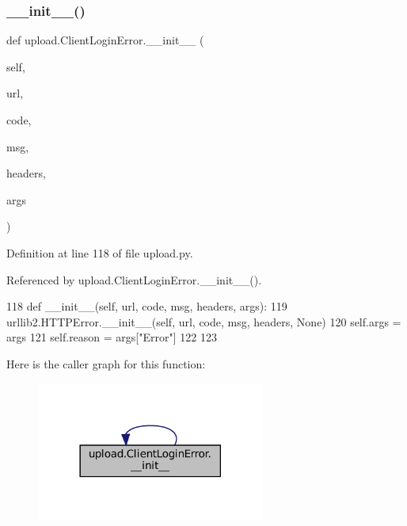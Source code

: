 \subsubsection{\texorpdfstring{\+\_\+\+\_\+init\+\_\+\+\_\+()}{\_\_init\_\_()}\hspace{0.1cm}{\footnotesize\ttfamily [1/2]}}
{\footnotesize\ttfamily def upload.\+Client\+Login\+Error.\+\_\+\+\_\+init\+\_\+\+\_\+ (\begin{DoxyParamCaption}\item[{}]{self,  }\item[{}]{url,  }\item[{}]{code,  }\item[{}]{msg,  }\item[{}]{headers,  }\item[{}]{args }\end{DoxyParamCaption})}



Definition at line 118 of file upload.\+py.



Referenced by upload.\+Client\+Login\+Error.\+\_\+\+\_\+init\+\_\+\+\_\+().


\begin{DoxyCode}
118   \textcolor{keyword}{def }\_\_init\_\_(self, url, code, msg, headers, args):
119     urllib2.HTTPError.\_\_init\_\_(self, url, code, msg, headers, \textcolor{keywordtype}{None})
120     self.args = args
121     self.reason = args[\textcolor{stringliteral}{"Error"}]
122 
123 
\end{DoxyCode}
Here is the caller graph for this function\+:
\nopagebreak
\begin{figure}[H]
\begin{center}
\leavevmode
\includegraphics[width=213pt]{classupload_1_1ClientLoginError_a1e590616c2976d881e155958cedbbe47_icgraph}
\end{center}
\end{figure}
\mbox{\label{classupload_1_1ClientLoginError_a1e590616c2976d881e155958cedbbe47}} 
